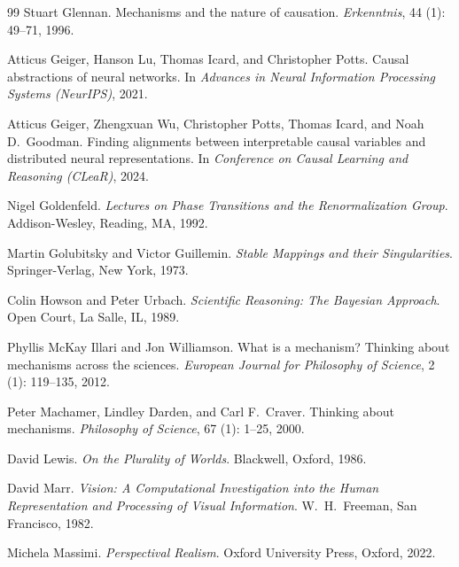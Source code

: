 \documentclass[11pt]{article}
\theoremstyle{remark}
\begin{document}
\begin{thebibliography}{99}
Stuart Glennan.
\newblock Mechanisms and the nature of causation.
\newblock \emph{Erkenntnis}, 44 (1): 49--71, 1996.

Atticus Geiger, Hanson Lu, Thomas Icard, and Christopher Potts.
\newblock Causal abstractions of neural networks.
\newblock In \emph{Advances in Neural Information Processing Systems
  (NeurIPS)}, 2021.

Atticus Geiger, Zhengxuan Wu, Christopher Potts, Thomas Icard, and Noah D.\
  Goodman.
\newblock Finding alignments between interpretable causal variables and
  distributed neural representations.
\newblock In \emph{Conference on Causal Learning and Reasoning (CLeaR)}, 2024.

Nigel Goldenfeld.
\newblock \emph{Lectures on Phase Transitions and the Renormalization Group}.
\newblock Addison-Wesley, Reading, MA, 1992.

Martin Golubitsky and Victor Guillemin.
\newblock \emph{Stable Mappings and their Singularities}.
\newblock Springer-Verlag, New York, 1973.

Colin Howson and Peter Urbach.
\newblock \emph{Scientific Reasoning: The Bayesian Approach}.
\newblock Open Court, La Salle, IL, 1989.

Phyllis McKay Illari and Jon Williamson.
\newblock What is a mechanism? Thinking about mechanisms across the sciences.
\newblock \emph{European Journal for Philosophy of Science},
  2 (1):\penalty0 119--135, 2012.

Peter Machamer, Lindley Darden, and Carl F.\ Craver.
\newblock Thinking about mechanisms.
\newblock \emph{Philosophy of Science}, 67 (1): 1--25, 2000.

David Lewis.
\newblock \emph{On the Plurality of Worlds}.
\newblock Blackwell, Oxford, 1986.

David Marr.
\newblock \emph{Vision: A Computational Investigation into the Human
  Representation and Processing of Visual Information}.
\newblock W.\ H.\ Freeman, San Francisco, 1982.

Michela Massimi.
\newblock \emph{Perspectival Realism}.
\newblock Oxford University Press, Oxford, 2022.


\end{thebibliography}
\end{document}
